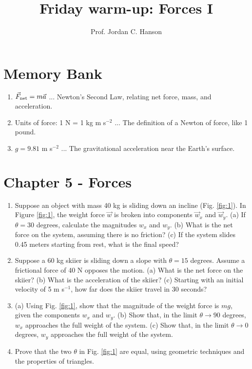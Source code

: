 \documentclass{article}
\begin{document}
\twocolumn

\title{Friday warm-up: Forces I}
\author{Prof. Jordan C. Hanson}

\maketitle

\section{Memory Bank}

\begin{enumerate}
\item $\vec{F}_{\rm net} = m \vec{a}$ ... Newton's Second Law, relating net force, mass, and acceleration.
\item Units of force: 1 N = 1 kg m s$^{-2}$ ... The definition of a Newton of force, like 1 pound.
\item $g = 9.81$ m s$^{-2}$ ... The gravitational acceleration near the Earth's surface.
\end{enumerate}

\section{Chapter 5 - Forces}

\begin{enumerate}
\item Suppose an object with mass 40 kg is sliding down an incline (Fig. \ref{fig:1}).  In Figure \ref{fig:1}, the weight force $\vec{w}$ is broken into components $\vec{w}_x$ and $\vec{w}_y$.  (a) If $\theta = 30$ degrees, calculate the magnitudes $w_x$ and $w_y$.  (b) What is the net force on the system, assuming there is no friction? (c) If the system slides 0.45 meters starting from rest, what is the final speed? \\ \vspace{2cm}
\item Suppose a 60 kg skiier is sliding down a slope with $\theta = 15$ degrees.  Assume a frictional force of 40 N opposes the motion. (a) What is the net force on the skiier?  (b) What is the acceleration of the skiier? (c)  Starting with an initial velocity of 5 m s$^{-1}$, how far does the skiier travel in 30 seconds? \\ \vspace{2cm}
\item (a) Using Fig. \ref{fig:1}, show that the magnitude of the weight force is $mg$, given the components $w_x$ and $w_y$. (b) Show that, in the limit $\theta \to 90$ degrees, $w_x$ approaches the full weight of the system.  (c) Show that, in the limit $\theta \to 0$ degrees, $w_y$ approaches the full weight of the system. \\ \vspace{2cm}
\item Prove that the two $\theta$ in Fig. \ref{fig:1} are equal, using geometric techniques and the properties of triangles.
\end{enumerate}
\end{document}
